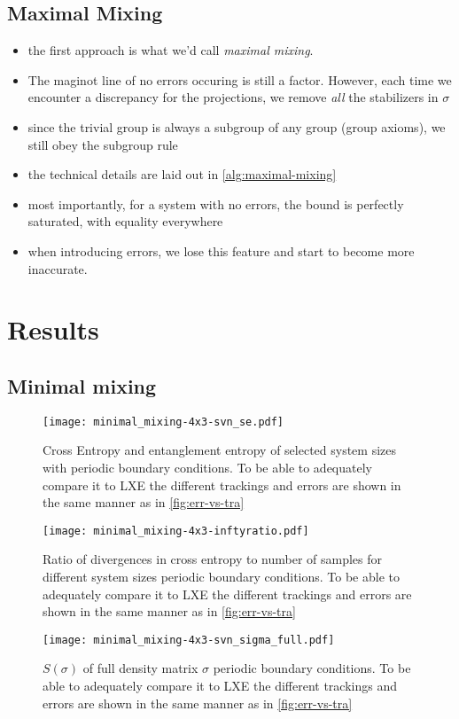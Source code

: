 \subsection{Maximal Mixing}\label{sec:maximal-mixing}
\begin{itemize}
  \item the first approach is what we'd call \emph{maximal mixing}.
  \item The maginot line of no errors occuring is still a factor. However, each
    time we encounter a discrepancy for the projections, we remove \emph{all}
    the stabilizers in $\sigma$
  \item since the trivial group is always a subgroup of any group (group
    axioms), we still obey the subgroup rule
  \item the technical details are laid out in \cref{alg:maximal-mixing}
  \item most importantly, for a system with no errors, the bound is perfectly
    saturated, with equality everywhere
  \item when introducing errors, we lose this feature and start to become more
    inaccurate.
\end{itemize}

\section{Results}\label{sec:upperbound-results}
\subsection{Minimal mixing}
\begin{figure}[H]
  \centering
  \texttt{[image: minimal\_mixing-4x3-svn\_se.pdf]}
  \caption{Cross Entropy and entanglement entropy of selected system sizes with
  periodic boundary conditions. To be able to adequately compare it to LXE the
different trackings and errors are shown in the same manner as in
\cref{fig:err-vs-tra}}
  \label{fig:min_mix-svn_se-4x3}
\end{figure}
\begin{figure}[H]
  \centering
  \texttt{[image: minimal\_mixing-4x3-inftyratio.pdf]}
  \caption{Ratio of divergences in cross entropy to number of samples for
    different system sizes
  periodic boundary conditions. To be able to adequately compare it to LXE the
different trackings and errors are shown in the same manner as in
\cref{fig:err-vs-tra}}
  \label{fig:min_mix-inftyratio-4x3}
\end{figure}
\begin{figure}[H]
  \centering
  \texttt{[image: minimal\_mixing-4x3-svn\_sigma\_full.pdf]}
  \caption{$S(\sigma)$ of full density matrix $\sigma$ 
  periodic boundary conditions. To be able to adequately compare it to LXE the
different trackings and errors are shown in the same manner as in
\cref{fig:err-vs-tra}}
  \label{fig:min_mix-svn_sigma_full-4x3}
\end{figure}
